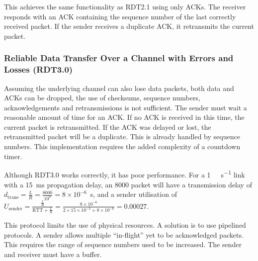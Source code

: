 This achieves the same functionality as RDT2.1 using only ACKs.
The receiver responds with an ACK containing the sequence number of the last correctly received packet.
If the sender receives a duplicate ACK, it retransmits the current packet.

\subsubsection[RDT Over a Channel with Errors and Losses (RDT3.0)]{Reliable Data Transfer Over a Channel with Errors and Losses (RDT3.0)}

Assuming the underlying channel can also lose data packets, both data and ACKs can be dropped, the use of checksums, sequence numbers, acknowledgements and retransmissions is not sufficient.
The sender must wait a reasonable amount of time for an ACK\@.
If no ACK is received in this time, the current packet is retransmitted.
If the ACK was delayed or lost, the retransmitted packet will be a duplicate.
This is already handled by sequence numbers.
This implementation requires the added complexity of a countdown timer.

Although RDT3.0 works correctly, it has poor performance.
For a \SI{1}{\giga\bit\per\second} link with a \SI{15}{\milli\second} propagation delay, an \SI{8000}{\bit} packet will have a transmission delay of \(d_{\text{trans}} = \frac{L}{R} = \frac{8000}{10^9} = 8 \times 10^{-6}\)~\si{\second}, and a sender utilisation of \(U_{\text{sender}} = \frac{\frac{L}{R}}{\text{RTT} + \frac{L}{R}} = \frac{8 \times 10^{-6}}{2 \times 15 \times 10^{-3} + 8 \times 10^{-6}} = 0.00027\).

This protocol limits the use of physical resources.
A solution is to use pipelined protocols.
A sender allows multiple ``in-flight'' yet to be acknowledged packets.
This requires the range of sequence numbers used to be increased.
The sender and receiver must have a buffer.

